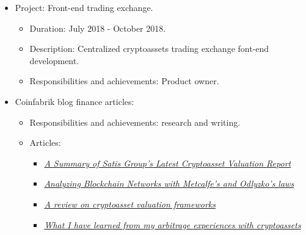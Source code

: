 \documentclass[11pt,a4paper,sans]{moderncv}        %
\begin{document}
{\begin{itemize}
\begin{itemize}
	\item Responsibilities and achievements: Decentralized platform design, including architecture, token dynamics, incentives and economics.
	\end{itemize}
\item Project: Front-end trading exchange.
	\begin{itemize}%
	\item Duration: July 2018 - October 2018.
	\item Description: Centralized cryptoassets trading exchange font-end development.
	\item Responsibilities and achievements: Product owner.
	\end{itemize}
\item Coinfabrik blog finance articles:
	\begin{itemize}%
	\item Responsibilities and achievements: research and writing.
	\item Articles:
		\begin{itemize}
		\item \href{https://blog.coinfabrik.com/a-summary-of-satis-groups-latest-cryptoasset-valuation-report/}{\textit{A Summary of Satis Group’s Latest Cryptoasset Valuation Report}}
		\item \href{https://blog.coinfabrik.com/analyzing-blockchain-networks-with-metcafes-and-odlyzkos-laws/}{\textit{Analyzing Blockchain Networks with Metcalfe’s and Odlyzko’s laws}}
		\item \href{https://blog.coinfabrik.com/a-review-on-cryptoasset-valuation-frameworks/}{\textit{A review on cryptoasset valuation frameworks}}
		\item \href{https://blog.coinfabrik.com/what-i-have-learned-from-my-arbitrage-experiences-with-cryptoassets/}{\textit{What I have learned from my arbitrage experiences with cryptoassets}}		
		\end{itemize}	
	\end{itemize}
\end{itemize}
}
\end{document}
